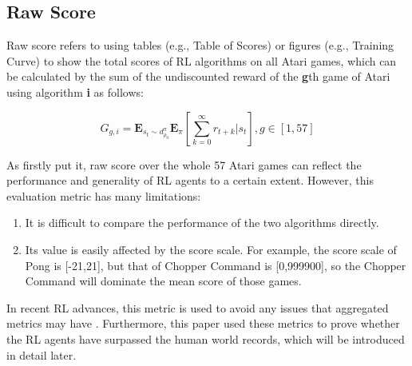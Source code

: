 \documentclass[nohyperref]{article}
\theoremstyle{plain}
\begin{document}
\subsection{Raw Score}

Raw score refers to using tables (e.g., Table of Scores) or figures (e.g., Training Curve) to show the total scores of RL algorithms on all Atari games, which can be calculated by the sum of the undiscounted reward of the \textbf{g}th game of Atari using algorithm \textbf{i} as follows:

\begin{equation}
\label{equ: raw score}
G_{g,i} =  \textbf{E}_{s_t \sim d_{\rho_0}^{\pi}} \textbf{E}_{\pi} \left[\sum_{k=0}^{\infty} r_{t+k} | s_t \right], g \in [1,57]
\end{equation}

As \citet{ale} firstly put it, raw score over the whole 57 Atari games can reflect the performance and generality of RL agents to a certain extent. However, this evaluation metric has many limitations:

\begin{enumerate}
    \item It is difficult to compare the performance of the two algorithms directly.
    \item Its value is easily affected by the score scale. For example, the score scale of Pong is [-21,21], but that of Chopper Command is [0,999900], so the Chopper Command will dominate the mean score of those games.
\end{enumerate}

In recent RL advances, this metric is used to avoid any issues that aggregated metrics may have \citep{agent57}. Furthermore, this paper used these metrics to prove whether the RL agents have surpassed the human world records, which will be introduced in detail later.
\end{document}
